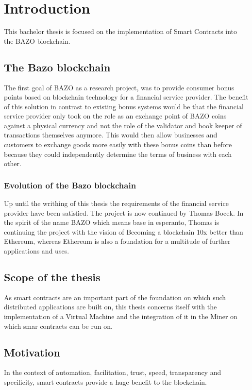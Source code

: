 \chapter{Introduction}
\thispagestyle{main} %
This bachelor thesis is focused on the implementation of Smart Contracts into the BAZO blockchain.
\section{The Bazo blockchain}
The first goal of BAZO as a research project, was to provide consumer bonus points based on blockchain technology for a financial service provider. The benefit of this solution in contrast to existing bonus systems would be that the financial service provider only took on the role as an exchange point of BAZO coins against a physical currency and not the role of the validator and book keeper of transactions themselves anymore. This would then allow businesses and customers to exchange goods more easily with these bonus coins than before because they could independently determine the terms of business with each other.

\subsection{Evolution of the Bazo blockchain}
Up until the writhing of this thesis the requirements of the financial service provider have been satisfied. The project is now continued by Thomas Bocek. In the spirit of the name BAZO which means base in esperanto, Thomas is continuing the project with the vision of \frqq Becoming a blockchain 10x better than Ethereum\flqq, whereas Ethereum is also a foundation for a multitude of further applications and uses.

\section{Scope of the thesis}
As smart contracts are an important part of the foundation on which such distributed applications are built on, this thesis concerns itself with the implementation of a Virtual Machine and the integration of it in the Miner on which smar contracts can be run on.

\section{Motivation}
In the context of automation, facilitation, trust, speed, transparency and specificity, smart contracts provide a huge benefit to the blockchain.

